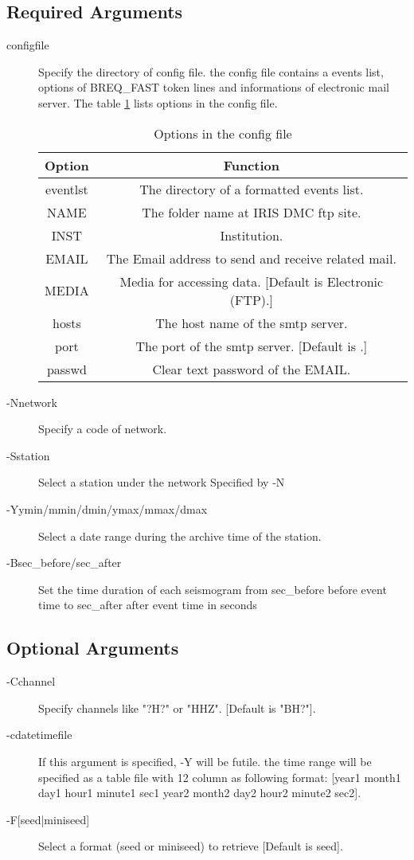 \documentclass[12pt, a4paper]{report}
\begin{document}
\subsection{Required Arguments}
\begin{description}
\item[{\ti configfile}] Specify the directory of config file. the config file contains a events list, options of BREQ\_FAST token lines and informations of electronic mail server. The table \ref{tab31} lists options in the config file.
\begin{table}
\caption{Options in the config file}
\centering
\begin{tabular}{c|c}\toprule[1.5 pt]
Option & Function \\ \midrule[1 pt]
{\C eventlst} & The directory of a formatted events list.\\
{\C NAME} &  The folder name at IRIS DMC ftp site.\\
{\C INST} & Institution.\\
{\C EMAIL} & The Email address to send and receive related mail.\\
{\C MEDIA} & Media for accessing data. [Default is {\C Electronic (FTP)}.]\\
{\C hosts} & The host name of the smtp server.\\
{\C port} & The port of the smtp server. [Default is {\C 25}.]\\
{\C passwd} & Clear text password of the {\C EMAIL}.\\
\bottomrule[1.5 pt]
\end{tabular}
\label{tab31}
\end{table}
\item[{\tb -N}{\ti network}] Specify a code of network.
\item[{\tb -S}{\ti station}] Select a station under the network Specified by {\tb -N}
\item[{\tb -Y}{\ti ymin/mmin/dmin/ymax/mmax/dmax}] Select a date range during the archive time of the station.
\item[{\tb -B}{\ti sec\_before/sec\_after}] Set the time duration of each seismogram from {\ti sec\_before} before event time to   {\ti sec\_after} after event time in seconds
\end{description}
\subsection{Optional Arguments}
\begin{description}
\item[{\tb -C}{\ti channel}] Specify channels like "{\ti ?H?}" or "{\ti HHZ}". [Default is "{\ti BH?}"]. 
\item[{\tb -c}{\ti datetimefile}] If this argument is specified, {\tb -Y} will be futile. the time range will be specified as a table file with 12 column as following format: [{\ti year1 month1 day1 hour1 minute1 sec1 year2 month2 day2 hour2 minute2 sec2}].
\item[{\tb -F[{\ti seed}|{\ti miniseed}]}] Select a format (seed or miniseed) to retrieve [Default is {\ti seed}].
\end{description}
\end{document}
